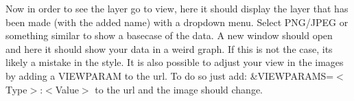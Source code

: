 Now in order to see the layer go to view, here it should display the layer that has been made (with the added name) with a dropdown menu. Select PNG/JPEG or something similar to show a basecase of the data. A new window should open and here it should show your data in a weird graph. If this is not the case, its likely a mistake in the style. It is also possible to adjust your view in the images by adding a VIEWPARAM to the url. To do so just add: \&VIEWPARAMS=$<$Type$>$:$<$Value$>$ to the url and the image should change.